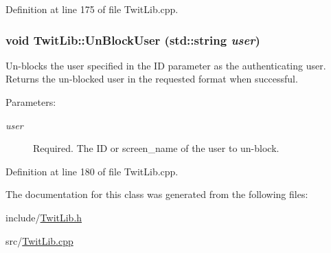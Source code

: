 Definition at line 175 of file TwitLib.cpp.\hypertarget{classTwitLib_0cc001b0c745187cb871508fe3a2bb37}{
\subsubsection{\setlength{\rightskip}{0pt plus 5cm}void TwitLib::UnBlockUser (std::string {\em user})}}
\label{classTwitLib_0cc001b0c745187cb871508fe3a2bb37}


Un-blocks the user specified in the ID parameter as the authenticating user. Returns the un-blocked user in the requested format when successful. \begin{Desc}
\item[Parameters:]
\begin{description}
\item[{\em user}]Required. The ID or screen\_\-name of the user to un-block. \end{description}
\end{Desc}


Definition at line 180 of file TwitLib.cpp.

The documentation for this class was generated from the following files:\begin{CompactItemize}
\item 
include/\hyperlink{TwitLib_8h}{TwitLib.h}\item 
src/\hyperlink{TwitLib_8cpp}{TwitLib.cpp}\end{CompactItemize}
